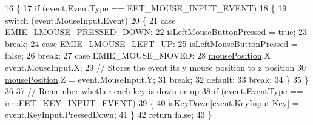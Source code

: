 \begin{DoxyCode}
16 \{
17     \textcolor{keywordflow}{if} (event.EventType == EET\_MOUSE\_INPUT\_EVENT)
18     \{
19         \textcolor{keywordflow}{switch} (event.MouseInput.Event)
20         \{
21         \textcolor{keywordflow}{case} EMIE\_LMOUSE\_PRESSED\_DOWN:
22             \hyperlink{class_input_receiver_a4c7159255233769f501c3950bcadc209}{isLeftMouseButtonPressed} = \textcolor{keyword}{true};
23             \textcolor{keywordflow}{break};
24         \textcolor{keywordflow}{case} EMIE\_LMOUSE\_LEFT\_UP:
25             \hyperlink{class_input_receiver_a4c7159255233769f501c3950bcadc209}{isLeftMouseButtonPressed} = \textcolor{keyword}{false};
26             \textcolor{keywordflow}{break};
27         \textcolor{keywordflow}{case} EMIE\_MOUSE\_MOVED:
28             \hyperlink{class_input_receiver_ae15f1ffaada0f66bbf3d727e67b0c3a5}{mousePosition}.X = \textcolor{keyword}{event}.MouseInput.X;
29             \textcolor{comment}{// Stores the event its y mouse position to z position}
30             \hyperlink{class_input_receiver_ae15f1ffaada0f66bbf3d727e67b0c3a5}{mousePosition}.Z = \textcolor{keyword}{event}.MouseInput.Y;
31             \textcolor{keywordflow}{break};
32         \textcolor{keywordflow}{default}:
33             \textcolor{keywordflow}{break};
34         \}
35     \}
36 
37     \textcolor{comment}{// Remember whether each key is down or up}
38     \textcolor{keywordflow}{if} (event.EventType == irr::EET\_KEY\_INPUT\_EVENT)
39     \{
40         \hyperlink{class_input_receiver_aaed36ea961cf8eb373fa57f7c1009a05}{isKeyDown}[\textcolor{keyword}{event}.KeyInput.Key] = \textcolor{keyword}{event}.KeyInput.PressedDown;
41     \}
42     \textcolor{keywordflow}{return} \textcolor{keyword}{false};
43 \}
\end{DoxyCode}


